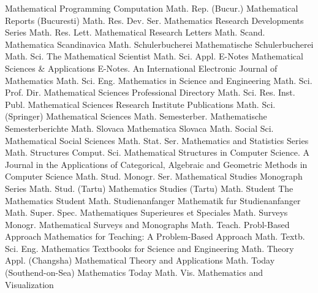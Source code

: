 {Mathematical Programming Computation}
{Math. Rep. (Bucur.)}
{Mathematical Reports (Bucuresti)}
{Math. Res. Dev. Ser.}
{Mathematics Research Developments Series}
{Math. Res. Lett.}
{Mathematical Research Letters}
{Math. Scand.}
{Mathematica Scandinavica}
{Math. Schulerbucherei}
{Mathematische Schulerbucherei}
{Math. Sci.}
{The Mathematical Scientist}
{Math. Sci. Appl. E-Notes}
{Mathematical Sciences & Applications E-Notes. An International Electronic Journal of Mathematics}
{Math. Sci. Eng.}
{Mathematics in Science and Engineering}
{Math. Sci. Prof. Dir.}
{Mathematical Sciences Professional Directory}
{Math. Sci. Res. Inst. Publ.}
{Mathematical Sciences Research Institute Publications}
{Math. Sci. (Springer)}
{Mathematical Sciences}
{Math. Semesterber.}
{Mathematische Semesterberichte}
{Math. Slovaca}
{Mathematica Slovaca}
{Math. Social Sci.}
{Mathematical Social Sciences}
{Math. Stat. Ser.}
{Mathematics and Statistics Series}
{Math. Structures Comput. Sci.}
{Mathematical Structures in Computer Science. A Journal in the Applications of Categorical, Algebraic and Geometric Methods in Computer Science}
{Math. Stud. Monogr. Ser.}
{Mathematical Studies Monograph Series}
{Math. Stud. (Tartu)}
{Mathematics Studies (Tartu)}
{Math. Student}
{The Mathematics Student}
{Math. Studienanfanger}
{Mathematik fur Studienanfanger}
{Math. Super. Spec.}
{Mathematiques Superieures et Speciales}
{Math. Surveys Monogr.}
{Mathematical Surveys and Monographs}
{Math. Teach. Probl-Based Approach}
{Mathematics for Teaching: A Problem-Based Approach}
{Math. Textb. Sci. Eng.}
{Mathematics Textbooks for Science and Engineering}
{Math. Theory Appl. (Changsha)}
{Mathematical Theory and Applications}
{Math. Today (Southend-on-Sea)}
{Mathematics Today}
{Math. Vis.}
{Mathematics and Visualization}

